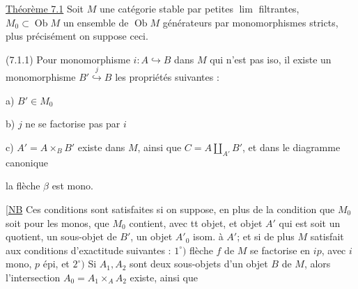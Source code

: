 


\uline{Théorème 7.1} Soit $M$ une catégorie stable par petites \uline{$\lim$} filtrantes,  $M_0\subset\operatorname{Ob}M$ un ensemble de $\operatorname{Ob}M$ générateurs par monomorphismes stricts, plus précisément on suppose  ceci.

(7.1.1) Pour  monomorphisme $i\colon A\hookrightarrow B$ dans $M$ qui n'est pas iso, il existe un monomorphisme $B'\overset{j}{\hookrightarrow}B$  les propriétés suivantes :

a) $B'\in M_0$

b) $j$ ne se factorise pas par $i$

c) $A'=A\times_B B'$ existe dans $M$, ainsi que  $C=A\amalg_{A'}B'$, et  dans le diagramme canonique


la flèche $\beta$ est mono.

[\uline{NB} Ces conditions sont satisfaites si on suppose, en plus de la condition que $M_0$ soit  pour les monos, que $M_0$ contient, avec tt objet, et    objet $A'$ qui est  soit  un quotient,  un sous-objet de $B'$, un objet $A'_0$ isom. à $A'$; et si de plus $M$ satisfait aux conditions d'exactitude suivantes : $1^\circ)$  flèche $f$ de $M$ se factorise en $ip$, avec $i$ mono, $p$ épi, et $2^\circ)$ Si $A_1,A_2$ sont deux sous-objets d'un objet $B$ de $M$, alors l'intersection $A_0=A_1\times_A A_2$ existe, ainsi que 
